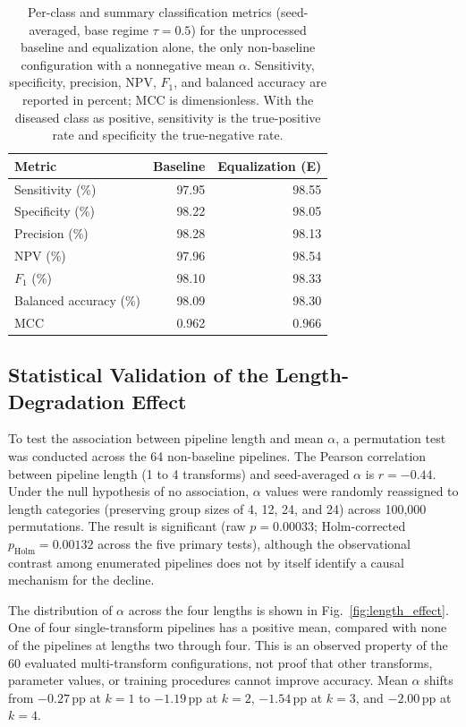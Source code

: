 \documentclass[preprint,review,12pt]{elsarticle}
\begin{document}
\begin{table}[!t]
\caption{Per-class and summary classification metrics (seed-averaged, base regime $\tau = 0.5$) for the unprocessed baseline and equalization alone, the only non-baseline configuration with a nonnegative mean $\alpha$. Sensitivity, specificity, precision, NPV, $F_1$, and balanced accuracy are reported in percent; MCC is dimensionless. With the diseased class as positive, sensitivity is the true-positive rate and specificity the true-negative rate.\label{tab:clinical}}
\centering
\footnotesize
\begin{tabular}{l r r}
\toprule
\textbf{Metric} & \textbf{Baseline} & \textbf{Equalization (E)} \\
\midrule
Sensitivity (\%)       & 97.95 & 98.55 \\
Specificity (\%)       & 98.22 & 98.05 \\
Precision (\%)         & 98.28 & 98.13 \\
NPV (\%)               & 97.96 & 98.54 \\
$F_1$ (\%)             & 98.10 & 98.33 \\
Balanced accuracy (\%) & 98.09 & 98.30 \\
MCC                    & 0.962 & 0.966 \\
\bottomrule
\end{tabular}
\end{table}

\subsection{Statistical Validation of the Length-Degradation Effect}
\label{subsec:length_degradation}

To test the association between pipeline length and mean $\alpha$, a permutation test was conducted across the 64 non-baseline pipelines. The Pearson correlation between pipeline length (1 to 4 transforms) and seed-averaged $\alpha$ is $r = -0.44$. Under the null hypothesis of no association, $\alpha$ values were randomly reassigned to length categories (preserving group sizes of 4, 12, 24, and 24) across 100{,}000 permutations. The result is significant (raw $p = 0.00033$; Holm-corrected $p_{\text{Holm}} = 0.00132$ across the five primary tests), although the observational contrast among enumerated pipelines does not by itself identify a causal mechanism for the decline.

The distribution of $\alpha$ across the four lengths is shown in Fig.~\ref{fig:length_effect}. One of four single-transform pipelines has a positive mean, compared with none of the pipelines at lengths two through four. This is an observed property of the 60 evaluated multi-transform configurations, not proof that other transforms, parameter values, or training procedures cannot improve accuracy. Mean $\alpha$ shifts from $-0.27$\,pp at $k=1$ to $-1.19$\,pp at $k=2$, $-1.54$\,pp at $k=3$, and $-2.00$\,pp at $k=4$.
\end{document}

